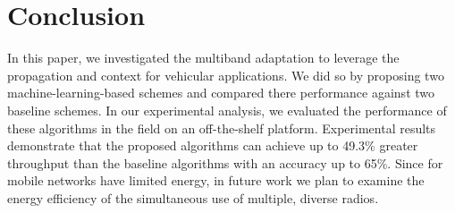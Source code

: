 \section{Conclusion}
\label{sec:conclusion}
In this paper, we investigated the multiband adaptation to leverage the propagation and context for vehicular applications. 
We did so by proposing two machine-learning-based schemes and compared there
performance against two baseline schemes.
In our experimental analysis, we evaluated the performance of these algorithms 
in the field on an off-the-shelf platform.
Experimental results demonstrate that the proposed algorithms can 
achieve up to 49.3\% greater throughput than the baseline algorithms
with an accuracy up to 65\%. Since for mobile networks have limited
energy, in future work we plan to examine the energy efficiency of
the simultaneous use of multiple, diverse radios.
